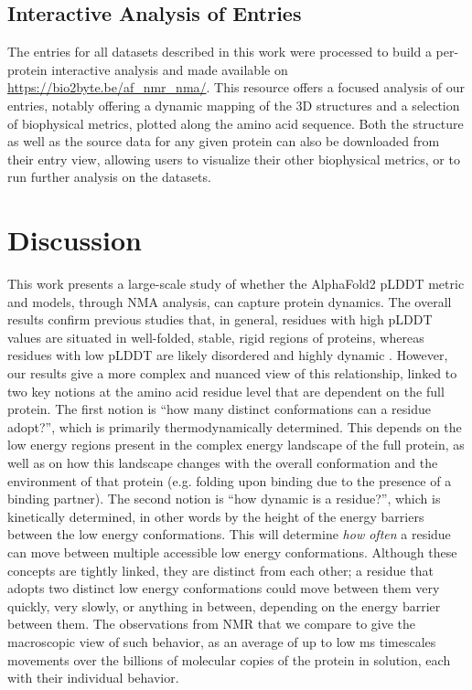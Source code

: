 \subsection{Interactive Analysis of Entries}

The entries for all datasets described in this work were processed to build a per-protein interactive analysis and made available on \url{https://bio2byte.be/af_nmr_nma/}. This resource offers a focused analysis of our entries, notably offering a dynamic mapping of the 3D structures and a selection of biophysical metrics, plotted along the amino acid sequence. Both the structure as well as the source data for any given protein can also be downloaded from their entry view, allowing users to visualize their other biophysical metrics, or to run further analysis on the datasets. 

\section{Discussion}

This work presents a large-scale study of whether the AlphaFold2 pLDDT metric and models, through NMA analysis, can capture protein dynamics. The overall results confirm previous studies that, in general, residues with high pLDDT values are situated in well-folded, stable, rigid regions of proteins, whereas residues with low pLDDT are likely disordered and highly dynamic \cite{piovesan_intrinsic_2022, akdel2022structural, bruley2022digging}. However, our results give a more complex and nuanced view of this relationship, linked to two key notions at the amino acid residue level that are dependent on the full protein. The first notion is ``how many distinct conformations can a residue adopt?'', which is primarily thermodynamically determined. This depends on the low energy regions present in the complex energy landscape of the full protein, as well as on how this landscape changes with the overall conformation and the environment of that protein (e.g. folding upon binding due to the presence of a binding partner). The second notion is ``how dynamic is a residue?'', which is kinetically determined, in other words by the height of the energy barriers between the low energy conformations. This will determine \textit{how often} a residue can move between multiple accessible low energy conformations. Although these concepts are tightly linked, they are distinct from each other; a residue that adopts two distinct low energy conformations could move between them very quickly, very slowly, or anything in between, depending on the energy barrier between them. The observations from NMR that we compare to give the macroscopic view of such behavior, as an average of up to low ms timescales movements over the billions of molecular copies of the protein in solution, each with their individual behavior.


